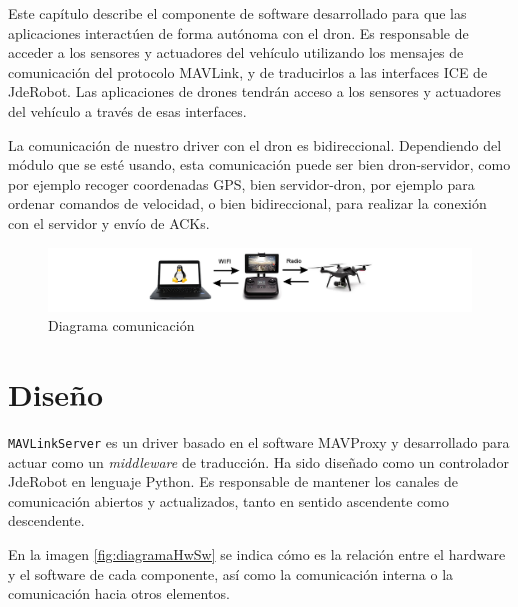 Este capítulo describe el componente de software desarrollado para que las aplicaciones interactúen de forma autónoma con el dron. Es responsable de acceder a los sensores y actuadores del vehículo utilizando los mensajes de comunicación del protocolo MAVLink, y de traducirlos a las interfaces ICE de JdeRobot. Las aplicaciones de drones tendrán acceso a los sensores y actuadores del vehículo a través de esas interfaces.

La comunicación de nuestro driver con el dron es bidireccional. Dependiendo del módulo que se esté usando, esta comunicación puede ser bien dron-servidor, como por ejemplo recoger coordenadas GPS, bien servidor-dron, por ejemplo para ordenar comandos de velocidad, o bien bidireccional, para realizar la conexión con el servidor y envío de ACKs. 

\begin{figure}[H]
  \hspace*{-3.5cm}
  \includegraphics[scale=0.5]{imagenes/muySencillo.png}
  \caption{Diagrama comunicación}
  \label{fig:diagramaComunicacionServerDron1}
\end{figure}

\section{Diseño}
\label{Diseno}

\texttt{MAVLinkServer} es un driver basado en el software MAVProxy y desarrollado para actuar como un \textit{middleware} de traducción. Ha sido diseñado como un controlador JdeRobot en lenguaje Python. Es responsable de mantener los canales de comunicación abiertos y actualizados, tanto en sentido ascendente como descendente. 

En la imagen \ref{fig:diagramaHwSw} se indica cómo es la relación entre el hardware y el software de cada componente, así como la comunicación interna o la comunicación hacia otros elementos.

